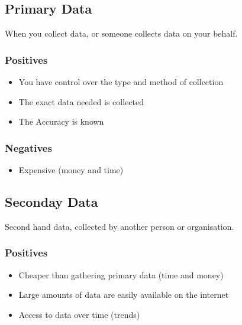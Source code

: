 \documentclass{article}
\begin{document}
\subsection{Primary Data}

When you collect data, or someone collects data on your behalf.

\subsubsection{Positives}

\begin{itemize}

    \item You have control over the type and method of collection 
    \item The exact data needed is collected 
    \item The Accuracy is known

\end{itemize}

\subsubsection{Negatives}

\begin{itemize}

    \item Expensive (money and time)
    
\end{itemize}

\subsection{Seconday Data}

Second hand data, collected by another person or organisation.

\subsubsection{Positives}
        
\begin{itemize}

    \item Cheaper than gathering primary data (time and money) 
    \item Large amounts of data are easily available on the internet 
    \item Access to data over time (trends)
    
\end{itemize}
\end{document}
